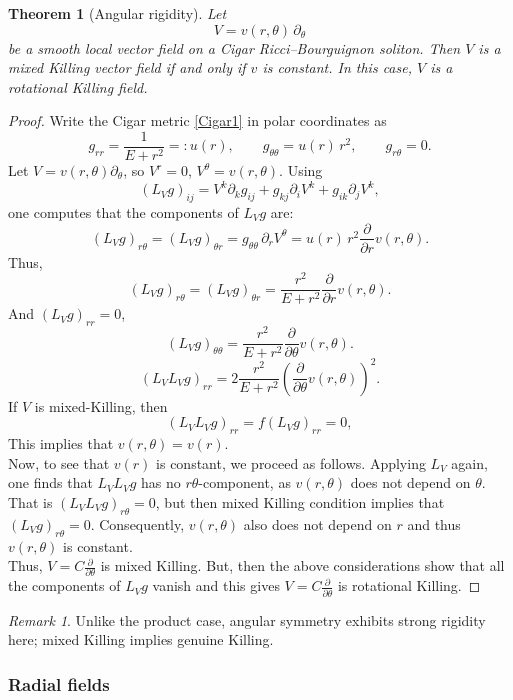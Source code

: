 \documentclass{article}
\newtheorem{theorem}{Theorem}[section]
\theoremstyle{definition}
\theoremstyle{remark}
\newtheorem{remark}{Remark}[section]
\begin{document}
\begin{theorem}[Angular rigidity]\label{thm:Cigar-angular}
Let
\[
V = v(r, \theta)\,\partial_\theta
\]
be a smooth local vector field on a Cigar Ricci--Bourguignon soliton.
Then $V$ is a mixed Killing vector field if and only if $v$ is constant.
In this case, $V$ is a rotational Killing field. 
\end{theorem}
\begin{proof}
Write the Cigar metric   \eqref{Cigar1}   in polar coordinates as
\[
g_{rr}=\frac{1}{E+r^2}=:u(r),\qquad g_{\theta\theta}=u(r)\,r^2,\qquad g_{r\theta}=0.
\]
Let $V=v(r, \theta)\partial_\theta$, so $V^r=0$, $V^\theta=v(r, \theta)$. Using 
$$(L_V g)_{ij}=V^k\partial_k g_{ij}+g_{kj}\partial_i V^k+g_{ik}\partial_j V^k,$$ one computes that the  components of $L_V g$ are:
\[
(L_V g)_{r\theta}=(L_V g)_{\theta r}=g_{\theta\theta}\,\partial_r V^\theta
= u(r)\,r^2   \frac{{\partial}}{{\partial r}} v(r, \theta).
\]
Thus, 
$$  (L_V g)_{r\theta}=(L_V g)_{\theta r}  =  \frac{r^2}{E+r^2}   \frac{{\partial}}{{\partial r}} v(r, \theta).$$
And $(L_V g)_{rr}= 0$,
\[
(L_V g)_{\theta\theta} = \frac{r^2}{E+r^2}   \frac{{\partial}}{{\partial \theta}} v(r, \theta).\]
$$(L_VL_Vg)_{rr}= 2 \frac{r^2}{E+r^2}   (\frac{{\partial}}{{\partial \theta}} v(r, \theta))^2.$$
If $V$ is  mixed-Killing, then 
$$  (L_VL_Vg)_{rr} =  f (L_V g)_{rr}= 0,$$
 This implies that $v(r, \theta) = v(r).$\\
Now, to see that $v(r)$ is constant, we proceed as follows.  
Applying $L_V$ again, one finds that $L_VL_Vg$ has no $r\theta$-component,
as $v(r, \theta)$ does not depend on $\theta$. That is
$(L_VL_Vg)_{r \theta} = 0$, but then mixed Killing condition implies that 
 $(L_V g)_{r\theta} = 0$. Consequently, $v(r, \theta)$ also does not depend 
 on $r$ and thus $v(r, \theta)$ is constant.  \\
 Thus, $V =  C  \frac{{\partial}}{{\partial \theta}}$  is mixed Killing.
 But, then the above considerations show that all the components of  $L_V g$  
 vanish and this gives $V =  C  \frac{{\partial}}{{\partial \theta}}$
 is rotational Killing.
\end{proof}

\begin{remark}
Unlike the product case, angular symmetry exhibits strong rigidity here; mixed Killing implies genuine Killing.
\end{remark}

\subsubsection{Radial fields}
\end{document}
